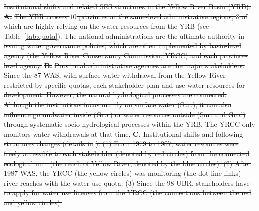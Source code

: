 \documentclass[default, sn-standardnature]{sn-jnl} %
\providecommand{\DIFdeltex}[1]{{\protect\color{red}\sout{#1}}}                      %
\providecommand{\DIFdelbegin}{} %
\providecommand{\DIFdelend}{} %
\providecommand{\DIFdelFL}[1]{\DIFdel{#1}} %
\providecommand{\DIFdel}[1]{\texorpdfstring{\DIFdeltex{#1}}{}} %
\newcommand{\DIFscaledelfig}{0.5}
\newlength{\DIFdelgraphicswidth} %
\newlength{\DIFdelgraphicsheight} %
\newcommand{\DIFdelincludegraphics}[2][]{%
\sbox{\DIFdelgraphicsbox}{\DIFOincludegraphics[#1]{#2}}%
\settoboxwidth{\DIFdelgraphicswidth}{\DIFdelgraphicsbox} %
\settoboxtotalheight{\DIFdelgraphicsheight}{\DIFdelgraphicsbox} %
\scalebox{\DIFscaledelfig}{%
\parbox[b]{\DIFdelgraphicswidth}{\usebox{\DIFdelgraphicsbox}\\[-\baselineskip] \rule{\DIFdelgraphicswidth}{0em}}\llap{\resizebox{\DIFdelgraphicswidth}{\DIFdelgraphicsheight}{%
\setlength{\unitlength}{\DIFdelgraphicswidth}%
\begin{picture}(1,1)%
\thicklines\linethickness{2pt} %
{\color[rgb]{1,0,0}\put(0,0){\framebox(1,1){}}}%
{\color[rgb]{1,0,0}\put(0,0){\line( 1,1){1}}}%
{\color[rgb]{1,0,0}\put(0,1){\line(1,-1){1}}}%
\end{picture}%
}\hspace*{3pt}}} %
} %
\DeclareRobustCommand{\DIFdelbegin}{\DIFOdelbegin \let\includegraphics\DIFdelincludegraphics} %
\DeclareRobustCommand{\DIFdelend}{\DIFOaddend \let\includegraphics\DIFOincludegraphics} %
\begin{document}
\DIFdelbegin %
{%
		\DIFdelFL{Institutional shifts and related SES structures in the Yellow River Basin (YRB).
		}\textbf{\DIFdelFL{A.}} %
\DIFdelFL{The YBR crosses $10$ provinces or the same-level administrative regions, $8$ of which are highly relying on the water resources from the YRB (see }\textit{%
} %
\DIFdelFL{Table~\ref{tab:quota}). The national administrations are the ultimate authority in issuing water governance policies, which are often implemented by basin-level agency (the Yellow River Conservancy Commission, YRCC) and each province-level agency.
		}\textbf{\DIFdelFL{B.}} %
\DIFdelFL{Provincial administrative agencies are the major stakeholders. Since the 87-WAS, with surface water withdrawal from the Yellow River restricted by specific quotas, each stakeholder plan and use water resources for development. However, the natural hydrological processes are connected. Although the institutions focus mainly on surface water (Sur.), it can also influence groundwater inside (Gro.) or water resources outside (Sur. and Gro.') through systematic socio-hydrological processes within the YRB. The YRCC only monitors water withdrawals at that time.
		}\textbf{\DIFdelFL{C.}} %
\DIFdelFL{Institutional shifts and following structures changes (details in }\textit{%
}%
\DIFdelFL{). (1) From 1979 to 1987, water resources were freely accessible to each stakeholder (denoted by red circles) from the connected ecological unit (the reach of Yellow River, denoted by the blue circles). (2) After 1987-WAS, the YRCC (the yellow circles) was monitoring (the dot-line links) river reaches with the water use quota. (3) Since the 98-UBR, stakeholders have to apply for water use licenses from the YRCC (the connections between the red and yellow circles).
	}}

\DIFdelend %
\end{document}
